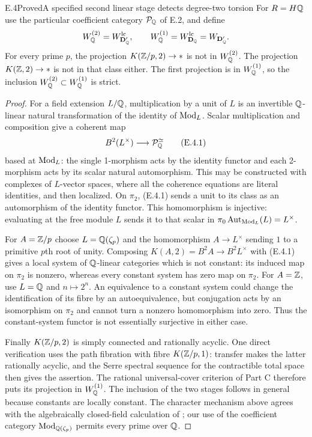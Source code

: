 \begin{claim}{E.4}{Proved}{A specified second linear stage detects degree-two torsion}
For $R=H\mathbb Q$ use the particular coefficient category $\mathcal P_\mathbb Q$ of
E.2, and define
\[
 W_{\mathbb Q}^{(2)}=W_{\mathbf D'_\mathbb Q}^{\mathrm{lc}},\qquad
 W_{\mathbb Q}^{(1)}=W_{\mathbf D_\mathbb Q}^{\mathrm{lc}}=W_{\mathbf D'_\mathbb Q}.
\]
For every prime $p$, the projection $K(\mathbb Z/p,2)\to *$ is not in
$W_{\mathbb Q}^{(2)}$.  The projection $K(\mathbb Z,2)\to *$ is not in that
class either.  The first projection is in $W_{\mathbb Q}^{(1)}$, so the
inclusion $W_{\mathbb Q}^{(2)}\subset W_{\mathbb Q}^{(1)}$ is strict.
\end{claim}
\begin{proof}
For a field extension $L/\mathbb Q$, multiplication by a unit of $L$ is an
invertible $\mathbb Q$-linear natural transformation of the identity of
$\operatorname{Mod}_L$.  Scalar multiplication and composition give a coherent
map
\[
             B^2(L^\times)\longrightarrow\mathcal P_\mathbb Q^{\simeq}
                                                               \tag{E.4.1}
\]
based at $\operatorname{Mod}_L$: the single 1-morphism acts by the identity functor
and each 2-morphism acts by its scalar natural automorphism.  This may
be constructed with complexes of $L$-vector spaces, where all the
coherence equations are literal identities, and then localized.
On $\pi_2$, (E.4.1) sends a unit to its class as an automorphism of
the identity functor.  This homomorphism is injective: evaluating at
the free module $L$ sends it to that scalar in
$\pi_0\operatorname{Aut}_{\operatorname{Mod}_L}(L)=L^\times$.

For $A=\mathbb Z/p$ choose $L=\mathbb Q(\zeta_p)$ and the homomorphism
$A\to L^\times$ sending $1$ to a primitive $p$th root of unity.
Composing $K(A,2)=B^2A\to B^2L^\times$ with (E.4.1) gives a local
system of $\mathbb Q$-linear categories which is not constant: its induced
map on $\pi_2$ is nonzero, whereas every constant system has zero
map on $\pi_2$.  For $A=\mathbb Z$, use $L=\mathbb Q$ and $n\mapsto2^n$.
An equivalence to a constant system could change the identification
of its fibre by an autoequivalence, but conjugation acts by an
isomorphism on $\pi_2$ and cannot turn a nonzero homomorphism into
zero.  Thus the constant-system functor is not essentially surjective
in either case.

Finally $K(\mathbb Z/p,2)$ is simply connected and rationally acyclic.
One direct verification uses the path fibration with fibre
$K(\mathbb Z/p,1)$: transfer makes the latter rationally acyclic, and the
Serre spectral sequence for the contractible total space then gives
the assertion.  The rational universal-cover criterion of Part C
therefore puts its projection in $W_{\mathbb Q}^{(1)}$.
The inclusion of the two stages follows in general because constants
are locally constant.  The character mechanism above agrees with
the algebraically closed-field calculation of
\citet[Proposition 2.21]{EF_PPS2025}; our use of the coefficient
category $\operatorname{Mod}_{\mathbb Q(\zeta_p)}$ permits every prime over $\mathbb Q$.
\end{proof}

